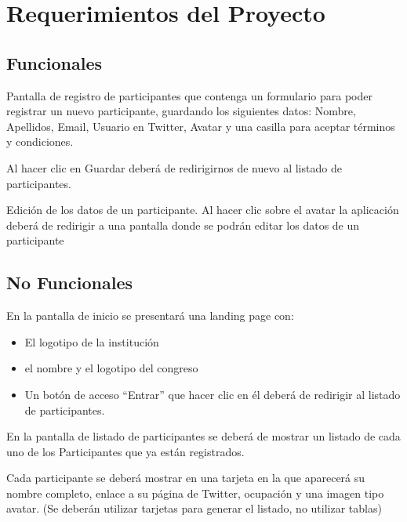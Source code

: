\chapter{Requerimientos del Proyecto}

\setcounter{cRequerimientos}{0}
\newcommand{\IncReq}{\addtocounter{cRequerimientos}{1}}


\section{Funcionales}
\begin{list}{RF\_\IncReq\thecRequerimientos}{}
	\item Pantalla de registro de participantes que contenga un formulario para poder registrar un nuevo participante, guardando los siguientes datos: Nombre, Apellidos, Email, Usuario en Twitter, Avatar y una casilla para aceptar términos y condiciones.
	
	Al hacer clic en Guardar deberá de redirigirnos de nuevo al listado de participantes.
	
	\item Edición  de los datos de un participante.  Al hacer clic sobre el avatar la aplicación deberá de redirigir 
	a una pantalla donde se podrán editar los datos de un participante
\end{list}

\section{No Funcionales}

\begin{list}{RNF\_\IncReq\thecRequerimientos}{}
	\item En la pantalla de inicio se presentará una landing page con:
	\begin{itemize}
		\item El logotipo de la institución
		\item el nombre y el logotipo del congreso
		\item Un botón de acceso ``Entrar'' que hacer clic en él deberá de redirigir al listado de participantes.
	\end{itemize}
	
	\item En la pantalla de listado de participantes se deberá de mostrar un listado de cada uno de los Participantes que ya están registrados. 
	
	Cada participante se deberá mostrar en una tarjeta en la que aparecerá su nombre completo, enlace a su página de Twitter, ocupación y una imagen tipo avatar.
	(Se deberán utilizar tarjetas para generar el listado, no utilizar tablas)
\end{list}